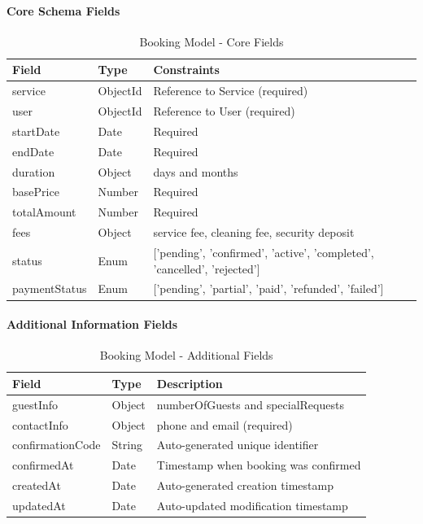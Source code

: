 \documentclass[12pt,a4paper]{article}
\begin{document}
\paragraph{Core Schema Fields}
\begin{table}[H]
\centering
\small
\begin{tabular}{@{}lll@{}}
\toprule
\textbf{Field} & \textbf{Type} & \textbf{Constraints} \\
\midrule
service & ObjectId & Reference to Service (required) \\
user & ObjectId & Reference to User (required) \\
startDate & Date & Required \\
endDate & Date & Required \\
duration & Object & days and months \\
basePrice & Number & Required \\
totalAmount & Number & Required \\
fees & Object & service fee, cleaning fee, security deposit \\
status & Enum & ['pending', 'confirmed', 'active', 'completed', 'cancelled', 'rejected'] \\
paymentStatus & Enum & ['pending', 'partial', 'paid', 'refunded', 'failed'] \\
\bottomrule
\end{tabular}
\caption{Booking Model - Core Fields}
\label{tab:booking-core-schema}
\end{table}

\paragraph{Additional Information Fields}
\begin{table}[H]
\centering
\small
\begin{tabular}{@{}lll@{}}
\toprule
\textbf{Field} & \textbf{Type} & \textbf{Description} \\
\midrule
guestInfo & Object & numberOfGuests and specialRequests \\
contactInfo & Object & phone and email (required) \\
confirmationCode & String & Auto-generated unique identifier \\
confirmedAt & Date & Timestamp when booking was confirmed \\
createdAt & Date & Auto-generated creation timestamp \\
updatedAt & Date & Auto-updated modification timestamp \\
\bottomrule
\end{tabular}
\caption{Booking Model - Additional Fields}
\label{tab:booking-additional-schema}
\end{table}
\end{document}
